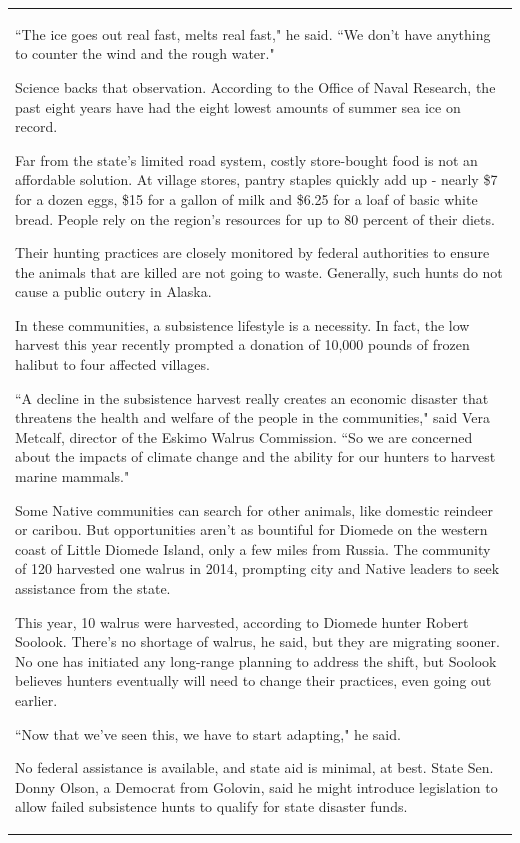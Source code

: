 \begin{table}
\begin{center}
\begin{tabular}{|L{14.7cm}|}
``The ice goes out real fast, melts real fast," he said. ``We don't have anything to counter the wind and the rough water."

Science backs that observation. According to the Office of Naval Research, the past eight years have had the eight lowest amounts of summer sea ice on record.

Far from the state's limited road system, costly store-bought food is not an affordable solution. At village stores, pantry staples quickly add up - nearly \$7 for a dozen eggs, \$15 for a gallon of milk and \$6.25 for a loaf of basic white bread. People rely on the region's resources for up to 80 percent of their diets.

Their hunting practices are closely monitored by federal authorities to ensure the animals that are killed are not going to waste. Generally, such hunts do not cause a public outcry in Alaska.

In these communities, a subsistence lifestyle is a necessity. In fact, the low harvest this year recently prompted a donation of 10,000 pounds of frozen halibut to four affected villages.

``A decline in the subsistence harvest really creates an economic disaster that threatens the health and welfare of the people in the communities," said Vera Metcalf, director of the Eskimo Walrus Commission. ``So we are concerned about the impacts of climate change and the ability for our hunters to harvest marine mammals."

Some Native communities can search for other animals, like domestic reindeer or caribou. But opportunities aren't as bountiful for Diomede on the western coast of Little Diomede Island, only a few miles from Russia. The community of 120 harvested one walrus in 2014, prompting city and Native leaders to seek assistance from the state.

This year, 10 walrus were harvested, according to Diomede hunter Robert Soolook. There's no shortage of walrus, he said, but they are migrating sooner. No one has initiated any long-range planning to address the shift, but Soolook believes hunters eventually will need to change their practices, even going out earlier.

``Now that we've seen this, we have to start adapting," he said.

No federal assistance is available, and state aid is minimal, at best. State Sen. Donny Olson, a Democrat from Golovin, said he might introduce legislation to allow failed subsistence hunts to qualify for state disaster funds.


\end{tabular}
\end{center}
\end{table}
